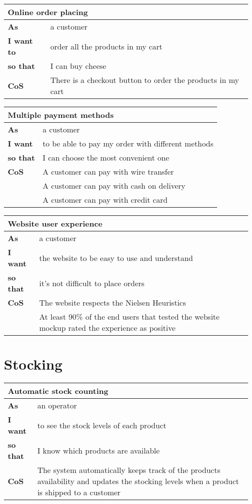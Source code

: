 \begin{tabularx}{\textwidth}{lX}
  \toprule
  \multicolumn{2}{l}{\textbf{Online order placing}} \\
  \midrule
  \textbf{As} & a customer \\
  \textbf{I want to} & order all the products in my cart \\
  \textbf{so that} & I can buy cheese \\
  \midrule
  \textbf{CoS} & There is a checkout button to order the products in my cart \\
  \bottomrule
\end{tabularx}

\begin{tabularx}{\textwidth}{lX}
  \toprule
  \multicolumn{2}{l}{\textbf{Multiple payment methods}} \\
  \midrule
  \textbf{As} & a customer \\
  \textbf{I want} & to be able to pay my order with different methods \\
  \textbf{so that} & I can choose the most convenient one \\
  \midrule
  \textbf{CoS} & A customer can pay with wire transfer \\
  & A customer can pay with cash on delivery \\
  & A customer can pay with credit card \\
  \bottomrule
\end{tabularx}

\begin{tabularx}{\textwidth}{lX}
  \toprule
  \multicolumn{2}{l}{\textbf{Website user experience}} \\
  \midrule
  \textbf{As} & a customer \\
  \textbf{I want} & the website to be easy to use and understand \\
  \textbf{so that} & it's not difficult to place orders \\
  \midrule
  \textbf{CoS} & The website respects the Nielsen Heuristics \\
  & At least 90\% of the end users that tested the website mockup rated the experience as positive \\
  \bottomrule
\end{tabularx}

\section{Stocking}
\begin{tabularx}{\textwidth}{lX}
  \toprule
  \multicolumn{2}{l}{\textbf{Automatic stock counting}} \\
  \midrule
  \textbf{As} & an operator \\
  \textbf{I want} & to see the stock levels of each product \\
  \textbf{so that} & I know which products are available \\
  \midrule
  \textbf{CoS} & The system automatically keeps track of the products availability and updates the stocking levels when a product is shipped to a customer \\
  \bottomrule
\end{tabularx}
